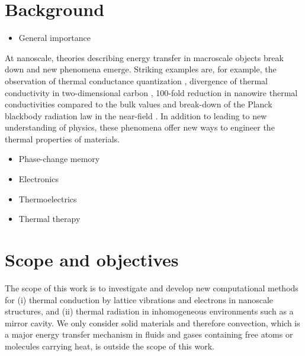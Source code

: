 
\section{Background}

\begin{itemize}
 \item General importance
\end{itemize}

At nanoscale, theories describing energy transfer in macroscale objects break down and new phenomena emerge. Striking examples are, for example, the observation of thermal conductance quantization \cite{schwab00}, divergence of thermal conductivity in two-dimensional carbon \cite{xu14}, 100-fold reduction in nanowire thermal conductivities compared to the bulk values \cite{} and break-down of the Planck blackbody radiation law in the near-field \cite{}. In addition to leading to new understanding of physics, these phenomena offer new ways to engineer the thermal properties of materials.

\begin{itemize}
 \item Phase-change memory
 \item Electronics
 \item Thermoelectrics
 \item Thermal therapy
\end{itemize}



\section{Scope and objectives}


The scope of this work is to investigate and develop new computational methods for (i) thermal conduction by lattice vibrations and electrons in nanoscale structures, and (ii) thermal radiation in inhomogeneous environments such as a mirror cavity. We only consider solid materials and therefore convection, which is a major energy transfer mechanism in fluids and gases containing free atoms or molecules carrying heat, is outside the scope of this work. %

